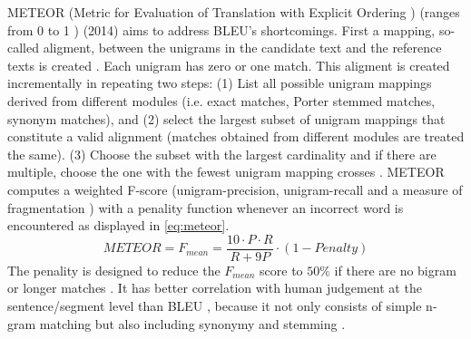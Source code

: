 METEOR (Metric for Evaluation of Translation with Explicit Ordering \cite{palivela_optimization_2021,banerjee_METEOR_2005}) 
(ranges from 0 to 1 \cite{kurt_pehlivanoglu_comparative_2024}) (2014) aims to address BLEU's shortcomings.
First a mapping, so-called aligment, between the unigrams in the candidate text and the reference texts is created \cite{banerjee_METEOR_2005}.
Each unigram has zero or one match.
This aligment is created incrementally in repeating two steps:
(1) List all possible unigram mappings derived from different modules (i.e. exact matches, Porter stemmed matches, synonym matches), 
and (2) select the largest subset of unigram mappings that constitute a valid alignment (matches obtained from different modules are treated the same).
(3) Choose the subset with the largest cardinality and if there are multiple, choose the one with the fewest unigram mapping crosses \cite{banerjee_METEOR_2005}.
METEOR computes a weighted F-score 
(unigram-precision, unigram-recall \cite{kurt_pehlivanoglu_comparative_2024,banerjee_METEOR_2005} 
and a measure of fragmentation \cite{banerjee_METEOR_2005,kurt_pehlivanoglu_comparative_2024})
with a penality function whenever an incorrect word is encountered \cite{palivela_optimization_2021} as displayed in \autoref{eq:meteor}.
\begin{equation}
    METEOR = F_{mean} = \frac{10 \cdot P \cdot R}{R + 9P} \cdot (1 - Penalty)
\label{eq:meteor}
\end{equation}
The penality is designed to reduce the $F_{mean}$ score to $50\%$ if there are no bigram or longer matches \cite{banerjee_METEOR_2005}.
It has better correlation with human judgement at the sentence/segment level than BLEU \cite{zhou_paraphrase_2021}, 
because it not only consists of simple n-gram matching but also including synonymy and stemming \cite{kurt_pehlivanoglu_comparative_2024}.

